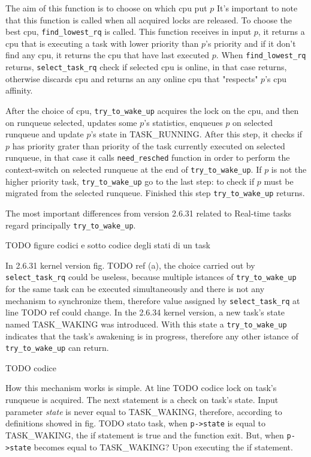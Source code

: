  The aim of this function is to choose on which cpu put $p$ 
It's important to note that this function is called when all acquired locks are released. To choose the best cpu, \texttt{find\_lowest\_rq} is called.
This function receives in input $p$, it returns a cpu that is executing a task with lower priority than $p$'s priority and if it don't find any cpu, it 
returns the cpu that have last executed $p$. When \texttt{find\_lowest\_rq} returns, \texttt{select\_task\_rq} check if selected cpu is online, in that case
returns, otherwise discards cpu and returns an any online cpu that "respects" $p$'s cpu affinity.

After the choice of cpu, \texttt{try\_to\_wake\_up} acquires the lock on the cpu, and then on runqueue selected, updates some $p$'s statistics, enqueues 
$p$ on selected runqueue and update $p$'s state in TASK\_RUNNING. After this step, it checks if $p$ has priority grater than priority of the task currently
executed on selected runqueue, in that case it calls \texttt{need\_resched} function in order to perform the context-switch on selected runqueue at the
end of \texttt{try\_to\_wake\_up}. If $p$ is not the higher priority task, \texttt{try\_to\_wake\_up} go to the last step: to check if $p$ must be migrated
from the selected runqueue. Finished this step \texttt{try\_to\_wake\_up} returns.

The most important differences from version 2.6.31 related to Real-time tasks regard principally \texttt{try\_to\_wake\_up}. 

TODO figure codici e sotto codice degli stati di un task

In 2.6.31 kernel version fig. TODO ref (a), the choice carried out by \texttt{select\_task\_rq} could be useless, because multiple istances of 
\texttt{try\_to\_wake\_up} for the same task can be executed simultaneously and there is not any mechanism to synchronize them, therefore value assigned 
by \texttt{select\_task\_rq} at line TODO ref could change. In the 2.6.34 kernel version, a new task's state named TASK\_WAKING was introduced. With this 
state a \texttt{try\_to\_wake\_up} indicates that the task's awakening is in progress, therefore any other istance of \texttt{try\_to\_wake\_up} can return.

TODO codice

How this mechanism works is simple. At line TODO codice lock on task's runqueue is acquired. The next statement is a check on task's state. Input parameter 
\textit{state} is never equal to TASK\_WAKING, therefore, according to definitions showed in fig. TODO stato task, when \texttt{p->state} is equal to 
TASK\_WAKING, the if statement is true and the function exit. But, when \texttt{p->state} becomes equal to TASK\_WAKING? Upon executing the if statement.

